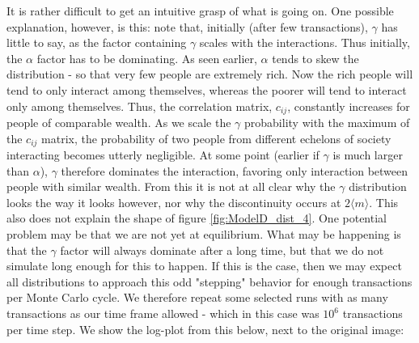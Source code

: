 \documentclass[a4paper, 10pt]{article}
\begin{document}
\linebreak
It is rather difficult to get an intuitive grasp of what is going on. One possible explanation, however, is this: note that, initially (after few transactions), $\gamma$ has little to say, as the factor containing $\gamma$ scales with the interactions. Thus initially, the $\alpha$ factor has to be dominating. As seen earlier, $\alpha$ tends to skew the distribution - so that very few people are extremely rich. Now the rich people will tend to only interact among themselves, whereas the poorer will tend to interact only among themselves. Thus, the correlation matrix, $c_{ij}$, constantly increases for people of comparable wealth. As we scale the $\gamma$ probability with the maximum of the $c_{ij}$ matrix, the probability of two people from different echelons of society interacting becomes utterly negligible. At some point (earlier if $\gamma$ is much larger than $\alpha$), $\gamma$ therefore dominates the interaction, favoring only interaction between people with similar wealth. From this it is not at all clear why the $\gamma$ distribution looks the way it looks however, nor why the discontinuity occurs at $2\langle m \rangle$. This also does not explain the shape of figure \ref{fig:ModelD_dist_4}.
\linebreak
One potential problem may be that we are not yet at equilibrium. What may be happening is that the $\gamma$  factor will always dominate after a long time, but that we do not simulate long enough for this to happen. If this is the case, then we may expect all distributions to approach this odd "stepping" behavior for enough transactions per Monte Carlo cycle. We therefore repeat some selected runs with as many transactions as our time frame allowed - which in this case was $10^6$ transactions per time step. We show the log-plot from this below, next to the original image:\\
\linebreak
\end{document}
